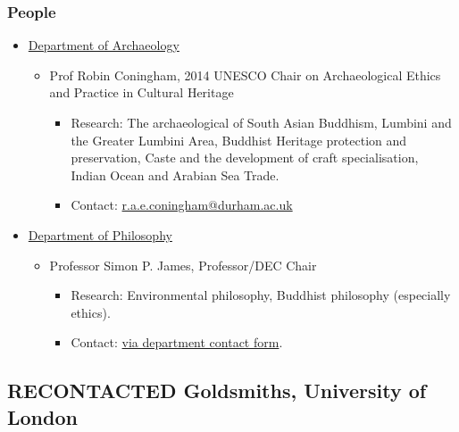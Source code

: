 \documentclass[11pt]{article}
\begin{document}
\subsubsection*{People}
\label{sec:org0a1f343}
\begin{itemize}
\item \href{https://www.durham.ac.uk/departments/academic/archaeology/}{Department of Archaeology}
\label{sec:org614e738}
\begin{itemize}
\item Prof Robin Coningham, 2014 UNESCO Chair on Archaeological Ethics and Practice in Cultural Heritage
\label{sec:org5e68626}
\begin{itemize}
\item Research: The archaeological of South Asian Buddhism, Lumbini and the Greater Lumbini Area, Buddhist Heritage protection and preservation, Caste and the development of craft specialisation, Indian Ocean and Arabian Sea Trade.\\
\item Contact: \href{mailto:r.a.e.coningham@durham.ac.uk}{r.a.e.coningham@durham.ac.uk}\\
\end{itemize}
\end{itemize}
\item \href{https://www.durham.ac.uk/departments/academic/philosophy/contact-us/}{Department of Philosophy}
\label{sec:org41484b6}
\begin{itemize}
\item Professor Simon P. James, Professor/DEC Chair
\label{sec:orgfdfed15}
\begin{itemize}
\item Research: Environmental philosophy, Buddhist philosophy (especially ethics).\\
\item Contact: \href{https://www.durham.ac.uk/departments/academic/philosophy/contact-us/}{via department contact form}.\\
\end{itemize}
\end{itemize}
\end{itemize}

\subsection*{{\bfseries\sffamily RECONTACTED} Goldsmiths, University of London}
\label{sec:org040650a}
\end{document}
